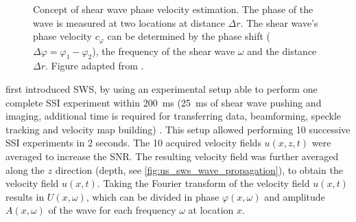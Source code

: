 \begin{figure}[t]
\begin{minipage}[t]{.48\textwidth}
      \caption{Concept of shear wave phase velocity estimation. The phase of the wave is measured at two locations at distance $\Delta r$. The shear wave's phase velocity $c_{\varphi}$ can be  determined by the phase shift ($\Delta \varphi = \varphi_1 - \varphi_2$), the frequency of the shear wave $\omega$ and the distance $\Delta r$. Figure adapted from \citet{chen_quantifying_2004}.}
      \label{fig:us_sws_phase_diff}
  \end{minipage}
\end{figure}


\citeauthor{deffieux_shear_2009} first introduced SWS, by using an experimental setup able to perform one complete SSI experiment within \SI{200}{\milli\second} (\SI{25}{\milli\second} of shear wave pushing and imaging, additional time is required for transferring data, beamforming, speckle tracking and velocity map building) \cite{deffieux_shear_2009}. This setup allowed performing 10 successive SSI experiments in 2 seconds. The 10 acquired velocity fields $u(x,z,t)$ were averaged to increase the SNR. The resulting velocity field was further averaged along the $z$ direction (depth, see \autoref{fig:us_sws_wave_propagation}), to obtain the velocity field $u(x,t)$. Taking the Fourier transform of the velocity field $u(x,t)$ results in $U(x,\omega)$, which can be divided in phase $\varphi(x,\omega)$ and amplitude $A(x,\omega)$ of the wave for each frequency $\omega$ at location $x$. 


